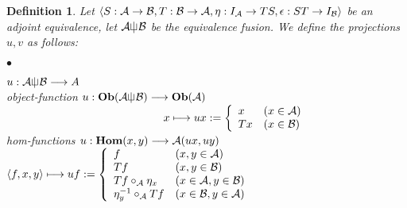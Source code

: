\documentclass[12pt]{article}
\theoremstyle{plain}
\newtheorem{definition}[theorem]{Definition}
\theoremstyle{definition}
\begin{document}
\begin{definition}
Let $\langle S:{\cal A}\rightarrow{\cal B}, T:{\cal B} \rightarrow {\cal A},  \eta :I_{{\cal A}} \rightarrow TS , \epsilon :ST \rightarrow I_{{\cal B}} \rangle$ be an adjoint equivalence, let ${\cal A}\sqcup \hspace{-.76em} \mid {\cal B}$ be the equivalence fusion. We define the {\em projections} $u,v$ as follows:

\begin{list}{$\bullet$}{}
\item $u:{\cal A}\sqcup \hspace{-.76em} \mid {\cal B} \longrightarrow A$ \\
 object-function 
$ u:{\bf Ob}{\rm (}{\cal A}\sqcup \hspace{-.76em} \mid {\cal B}{\rm )} \longrightarrow {\bf Ob}{\rm (}{\cal A}{\rm )} $ \\
$ \hspace{141pt} x  \longmapsto ux := \left\{ \begin{array}{ll}
x & {\rm (}x \in {\cal A}{\rm )} \\
Tx & {\rm (}x \in {\cal B}{\rm )} \\
\end{array} \right. $ \\
 hom-functions $u:{\bf Hom}{\rm (}x,y{\rm )} \longrightarrow {\cal A}{\rm (}ux,uy{\rm )}$ \\
\hspace{106pt} $\langle f,x,y \rangle \longmapsto uf := \left\{ \begin{array}{ll} 
f & {\rm (}x,y \in {\cal A}{\rm )} \\
Tf & {\rm (}x,y \in {\cal B}{\rm )} \\
Tf \circ_{{\cal A}} \eta_{x} & {\rm (}x \in {\cal A}, y \in {\cal B}{\rm )} \\
\eta_{y}^{-1} \circ_{{\cal A}} Tf & {\rm (}x \in {\cal B}, y \in {\cal A}{\rm )} \\
\end{array} \right. $ \\


\end{list}
\end{definition}
\end{document}

